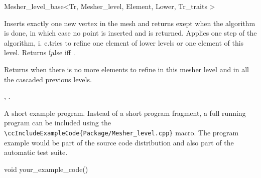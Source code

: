 \begin{ccRefClass}{Mesher_level_base<Tr, Mesher_level, Element, Lower,
Tr_traits >}
 
\begin{ccAdvanced}
 
 {Inserts exactly one new vertex in the mesh  and returns 
 exept when the algorithm is done, in which case no point is inserted
and  is returned.}
\ccGlue  
 {Applies one step of the algorithm, i. e.tries to refine one element of
   lower levels or one element of this level. Returns \c false iff 
   . }

{Returns  when there is no more elements to refine
in this mesher level and in all the cascaded previous levels.}

\end{ccAdvanced}







\ccSeeAlso

,
.

\ccExample

A short example program.
Instead of a short program fragment, a full running program can be
included using the 
\verb|\ccIncludeExampleCode{Package/Mesher_level.cpp}| 
macro. The program example would be part of the source code distribution and
also part of the automatic test suite.

\begin{ccExampleCode}
void your_example_code() {
}
\end{ccExampleCode}


\end{ccRefClass}



